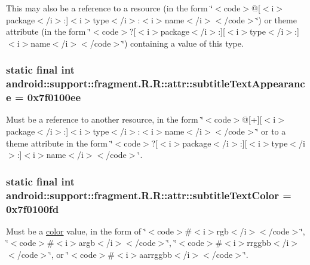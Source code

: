 This may also be a reference to a resource (in the form \char`\"{}$<$code$>$@\mbox{[}$<$i$>$package$<$/i$>$:\mbox{]}$<$i$>$type$<$/i$>$:$<$i$>$name$<$/i$>$$<$/code$>$\char`\"{}) or theme attribute (in the form \char`\"{}$<$code$>$?\mbox{[}$<$i$>$package$<$/i$>$:\mbox{]}\mbox{[}$<$i$>$type$<$/i$>$:\mbox{]}$<$i$>$name$<$/i$>$$<$/code$>$\char`\"{}) containing a value of this type. \hypertarget{classandroid_1_1support_1_1fragment_1_1_r_1_1attr_e8a43a2316f2e894f5e3529ba3ca9e97}{
\subsubsection[{subtitleTextAppearance}]{\setlength{\rightskip}{0pt plus 5cm}static final int android::support::fragment.R.R::attr::subtitleTextAppearance = 0x7f0100ee}}
\label{classandroid_1_1support_1_1fragment_1_1_r_1_1attr_e8a43a2316f2e894f5e3529ba3ca9e97}


Must be a reference to another resource, in the form \char`\"{}$<$code$>$@\mbox{[}+\mbox{]}\mbox{[}$<$i$>$package$<$/i$>$:\mbox{]}$<$i$>$type$<$/i$>$:$<$i$>$name$<$/i$>$$<$/code$>$\char`\"{} or to a theme attribute in the form \char`\"{}$<$code$>$?\mbox{[}$<$i$>$package$<$/i$>$:\mbox{]}\mbox{[}$<$i$>$type$<$/i$>$:\mbox{]}$<$i$>$name$<$/i$>$$<$/code$>$\char`\"{}. \hypertarget{classandroid_1_1support_1_1fragment_1_1_r_1_1attr_49dd59744cbbdba119e9d734670e7c8d}{
\subsubsection[{subtitleTextColor}]{\setlength{\rightskip}{0pt plus 5cm}static final int android::support::fragment.R.R::attr::subtitleTextColor = 0x7f0100fd}}
\label{classandroid_1_1support_1_1fragment_1_1_r_1_1attr_49dd59744cbbdba119e9d734670e7c8d}


Must be a \hyperlink{classandroid_1_1support_1_1fragment_1_1_r_1_1color}{color} value, in the form of \char`\"{}$<$code$>$\#$<$i$>$rgb$<$/i$>$$<$/code$>$\char`\"{}, \char`\"{}$<$code$>$\#$<$i$>$argb$<$/i$>$$<$/code$>$\char`\"{}, \char`\"{}$<$code$>$\#$<$i$>$rrggbb$<$/i$>$$<$/code$>$\char`\"{}, or \char`\"{}$<$code$>$\#$<$i$>$aarrggbb$<$/i$>$$<$/code$>$\char`\"{}. 

